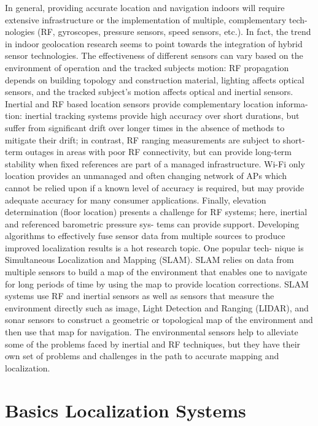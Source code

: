 In general, providing accurate location and navigation indoors will require
extensive infrastructure or the implementation of multiple, complementary tech-
nologies (RF, gyroscopes, pressure sensors, speed sensors, etc.). In fact, the trend
in indoor geolocation research seems to point towards the integration of hybrid
sensor technologies. The effectiveness of different sensors can vary based on the
environment of operation and the tracked subjects motion: RF propagation
depends on building topology and construction material, lighting affects optical
sensors, and the tracked subject’s motion affects optical and inertial sensors.
Inertial and RF based location sensors provide complementary location informa-
tion: inertial tracking systems provide high accuracy over short durations, but
suffer from significant drift over longer times in the absence of methods to mitigate
their drift; in contrast, RF ranging measurements are subject to short-term outages
in areas with poor RF connectivity, but can provide long-term stability when fixed
references are part of a managed infrastructure. Wi-Fi only location provides an
unmanaged and often changing network of APs which cannot be relied upon if a
known level of accuracy is required, but may provide adequate accuracy for many
consumer applications. Finally, elevation determination (floor location) presents a
challenge for RF systems; here, inertial and referenced barometric pressure sys-
tems can provide support.
Developing algorithms to effectively fuse sensor data from multiple sources to
produce improved localization results is a hot research topic. One popular tech-
nique is Simultaneous Localization and Mapping (SLAM). SLAM relies on data
from multiple sensors to build a map of the environment that enables one to
navigate for long periods of time by using the map to provide location corrections.
SLAM systems use RF and inertial sensors as well as sensors that measure the
environment directly such as image, Light Detection and Ranging (LIDAR), and
sonar sensors to construct a geometric or topological map of the environment and
then use that map for navigation. The environmental sensors help to alleviate some
of the problems faced by inertial and RF techniques, but they have their own set of
problems and challenges in the path to accurate mapping and localization.




\section{Basics Localization Systems}

